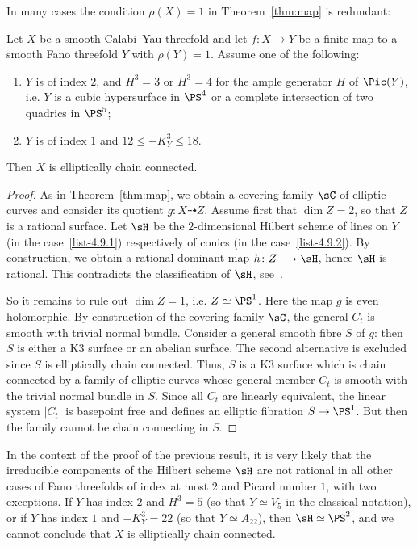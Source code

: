 In many cases the condition $\rho (X) = 1$ in Theorem~\ref{thm:map} is redundant:

\begin{theo}\label{thm:map2}
Let $X$ be a smooth Calabi--Yau threefold and let $f\colon X \to Y$ be a finite map to a smooth Fano threefold $Y$ with $\rho(Y) = 1$. Assume one of the following:
\begin{enumerate}\romanenumi
\item \label{list-4.9.1} $Y$ is of index $2$, and $H^3 = 3$ or $H^3 = 4$ for the ample generator $H$ of ${\Pic}(Y)$, i.e. $Y$ is a cubic hypersurface in $\PS^4$ or a complete intersection of two quadrics in $\PS^5$;
\item \label{list-4.9.2} $Y$ is of index $1$ and $12 \leq -K_Y^3 \leq 18$.
\end{enumerate}
Then $X$ is elliptically chain connected.
\end{theo}

\begin{proof}
As in Theorem~\ref{thm:map}, we obtain a covering family $\sC$ of elliptic curves and consider its quotient $g\colon X \dasharrow Z$. Assume first that $\dim Z = 2$, so that $Z$ is a rational surface. Let $\sH$ be the $2$-dimensional Hilbert scheme of lines on $Y$ (in the case~\eqref{list-4.9.1}) respectively of conics (in the case~\eqref{list-4.9.2}). By construction, we obtain a rational dominant map $h\colon Z \dasharrow \sH$, hence $\sH$ is rational. This contradicts the classification of $\sH$, see~\cite{KPS16}.

So it remains to rule out $\dim Z = 1$, i.e. $Z \simeq \PS^1$. Here the map $g$ is even holomorphic. By construction of the covering family $\sC$, the general $C_t$ is smooth with trivial normal bundle. Consider a general smooth fibre $S$ of $g$: then $S$ is either a K3 surface or an abelian surface. The second alternative is excluded since $S$ is elliptically chain connected. Thus, $S$ is a K3 surface which is chain connected by a family of elliptic curves whose general member $C_t$ is smooth with the trivial normal bundle in $S$. Since all $C_t$ are linearly equivalent, the linear system $|C_t|$ is basepoint free and defines an elliptic fibration $S \to \PS^1$. But then the family cannot be chain connecting in $S$.
\end{proof}

\begin{rema}\label{rema:main4.10}
In the context of the proof of the previous result, it is very likely that the irreducible components of the Hilbert scheme $\sH$ are not rational in all other cases of Fano threefolds of index at most $2$ and Picard number $1$, with two exceptions. If $Y$ has index $2$ and $H^3 = 5$ (so that $Y\simeq V_5$ in the classical notation), or if $Y$ has index $1$ and ${-}K_Y^3 = 22 $ (so that $Y\simeq A_{22}$), then $\sH \simeq \PS^2$, and we cannot conclude that $X$ is elliptically chain connected.
\end{rema}

